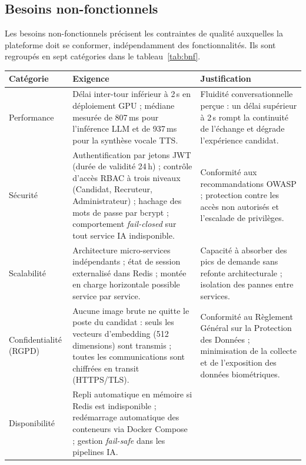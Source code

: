\subsection{Besoins non-fonctionnels}

Les besoins non-fonctionnels précisent les contraintes de qualité auxquelles la plateforme doit se conformer, indépendamment des fonctionnalités. Ils sont regroupés en sept catégories dans le tableau~\ref{tab:bnf}.

\begin{table}[H]
  \centering
  \footnotesize
  \renewcommand{\arraystretch}{1.45}
  \begin{tabularx}{\textwidth}{|>{\raggedright\arraybackslash}p{2.4cm}|>{\raggedright\arraybackslash}X|>{\raggedright\arraybackslash}X|}
    \hline
    \textbf{Catégorie} & \textbf{Exigence} & \textbf{Justification} \\
    \hline
    Performance & Délai inter-tour inférieur à 2\,s en déploiement GPU ; médiane mesurée de 807\,ms pour l'inférence LLM et de 937\,ms pour la synthèse vocale TTS. &
    Fluidité conversationnelle perçue : un délai supérieur à 2\,s rompt la continuité de l'échange et dégrade l'expérience candidat. \\
    \hline
    Sécurité & Authentification par jetons JWT (durée de validité 24\,h) ; contrôle d'accès RBAC à trois niveaux (Candidat, Recruteur, Administrateur) ; hachage des mots de passe par bcrypt ; comportement \textit{fail-closed} sur tout service IA indisponible. &
    Conformité aux recommandations OWASP ; protection contre les accès non autorisés et l'escalade de privilèges. \\
    \hline
    Scalabilité & Architecture micro-services indépendants ; état de session externalisé dans Redis ; montée en charge horizontale possible service par service. &
    Capacité à absorber des pics de demande sans refonte architecturale ; isolation des pannes entre services. \\
    \hline
    Confidentialité (RGPD) & Aucune image brute ne quitte le poste du candidat : seuls les vecteurs d'embedding (512 dimensions) sont transmis ; toutes les communications sont chiffrées en transit (HTTPS/TLS). &
    Conformité au Règlement Général sur la Protection des Données ; minimisation de la collecte et de l'exposition des données biométriques. \\
    \hline
    Disponibilité & Repli automatique en mémoire si Redis est indisponible ; redémarrage automatique des conteneurs via Docker Compose ; gestion \textit{fail-safe} dans les pipelines IA. &

\end{tabularx}
\end{table}
